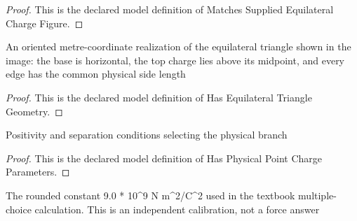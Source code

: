 \begin{proof}
  This is the declared model definition of Matches Supplied Equilateral Charge Figure.
\end{proof}
\begin{definition}
  \label{def:physics:phyx-mini-0894:phyxminiproblems-problemphyxmini0894-hasequilateraltrianglegeometry}
  An oriented metre-coordinate realization of the equilateral triangle shown in the image: the base is horizontal, the top charge lies above its midpoint, and every edge has the common physical side length
\end{definition}
\begin{proof}
  This is the declared model definition of Has Equilateral Triangle Geometry.
\end{proof}
\begin{definition}
  \label{def:physics:phyx-mini-0894:phyxminiproblems-problemphyxmini0894-hasphysicalpointchargeparameters}
  Positivity and separation conditions selecting the physical branch
\end{definition}
\begin{proof}
  This is the declared model definition of Has Physical Point Charge Parameters.
\end{proof}
\begin{definition}
  \label{def:physics:phyx-mini-0894:phyxminiproblems-problemphyxmini0894-usesroundedcoulombconstant}
  The rounded constant 9.0 * 10\textasciicircum{}9 N m\textasciicircum{}2/C\textasciicircum{}2 used in the textbook multiple-choice calculation. This is an independent calibration, not a force answer
\end{definition}
